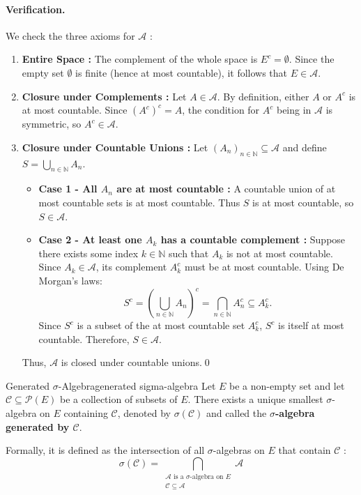 \paragraph{Verification.}
We check the three axioms for $\mathcal{A}$ :
\begin{enumerate}[label=(\roman*)]
    \item \textbf{Entire Space :} The complement of the whole space is $E^c = \emptyset$. Since the empty set $\emptyset$ is finite (hence at most countable), it follows that $E \in \mathcal{A}$.
    \item \textbf{Closure under Complements :} Let $A \in \mathcal{A}$. By definition, either $A$ or $A^c$ is at most countable. Since $(A^c)^c = A$, the condition for $A^c$ being in $\mathcal{A}$ is symmetric, so $A^c \in \mathcal{A}$.
    \item \textbf{Closure under Countable Unions :} Let $(A_n)_{n \in \mathbb{N}} \subseteq \mathcal{A}$ and define $S = \bigcup_{n \in \mathbb{N}} A_n$.
    \begin{itemize}
        \item \textbf{Case 1 - All $A_n$ are at most countable :} A countable union of at most countable sets is at most countable. Thus $S$ is at most countable, so $S \in \mathcal{A}$.
        \item \textbf{Case 2 - At least one $A_k$ has a countable complement :} Suppose there exists some index $k \in \mathbb{N}$ such that $A_k$ is not at most countable. Since $A_k \in \mathcal{A}$, its complement $A_k^c$ must be at most countable. Using De Morgan's laws:
        \[
            S^c = \left( \bigcup_{n \in \mathbb{N}} A_n \right)^c = \bigcap_{n \in \mathbb{N}} A_n^c \subseteq A_k^c.
        \]
        Since $S^c$ is a subset of the at most countable set $A_k^c$, $S^c$ is itself at most countable. Therefore, $S \in \mathcal{A}$.
    \end{itemize}
    Thus, $\mathcal{A}$ is closed under countable unions.\qed
\end{enumerate}


\begin{definition}{Generated $\sigma$-Algebra}{generated sigma-algebra}
Let $E$ be a non-empty set and let $\mathcal{C} \subseteq \mathcal{P}(E)$ be a collection of subsets of $E$. There exists a unique smallest $\sigma$-algebra on $E$ containing $\mathcal{C}$, denoted by $\sigma(\mathcal{C})$ and called the \textbf{$\sigma$-algebra generated by $\mathcal{C}$}.

Formally, it is defined as the intersection of all $\sigma$-algebras on $E$ that contain $\mathcal{C}$ :
\[
    \sigma(\mathcal{C}) = \bigcap_{\substack{\mathcal{A} \text{ is a } \sigma\text{-algebra on } E \\ \mathcal{C} \subseteq \mathcal{A}}} \mathcal{A}
\]
\end{definition}

